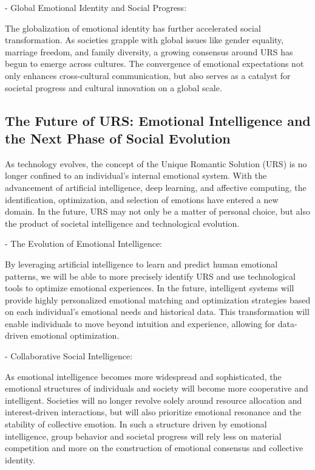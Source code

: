 \documentclass{article}
\begin{document}
- Global Emotional Identity and Social Progress:

The globalization of emotional identity has further accelerated social transformation. As societies grapple with global issues like gender equality, marriage freedom, and family diversity, a growing consensus around URS has begun to emerge across cultures. The convergence of emotional expectations not only enhances cross-cultural communication, but also serves as a catalyst for societal progress and cultural innovation on a global scale.

\subsection{The Future of URS: Emotional Intelligence and the Next Phase of Social Evolution}

As technology evolves, the concept of the Unique Romantic Solution (URS) is no longer confined to an individual's internal emotional system. With the advancement of artificial intelligence, deep learning, and affective computing, the identification, optimization, and selection of emotions have entered a new domain. In the future, URS may not only be a matter of personal choice, but also the product of societal intelligence and technological evolution.

- The Evolution of Emotional Intelligence:

By leveraging artificial intelligence to learn and predict human emotional patterns, we will be able to more precisely identify URS and use technological tools to optimize emotional experiences. In the future, intelligent systems will provide highly personalized emotional matching and optimization strategies based on each individual's emotional needs and historical data. This transformation will enable individuals to move beyond intuition and experience, allowing for data-driven emotional optimization.

- Collaborative Social Intelligence:

As emotional intelligence becomes more widespread and sophisticated, the emotional structures of individuals and society will become more cooperative and intelligent. Societies will no longer revolve solely around resource allocation and interest-driven interactions, but will also prioritize emotional resonance and the stability of collective emotion. In such a structure driven by emotional intelligence, group behavior and societal progress will rely less on material competition and more on the construction of emotional consensus and collective identity.
\end{document}
